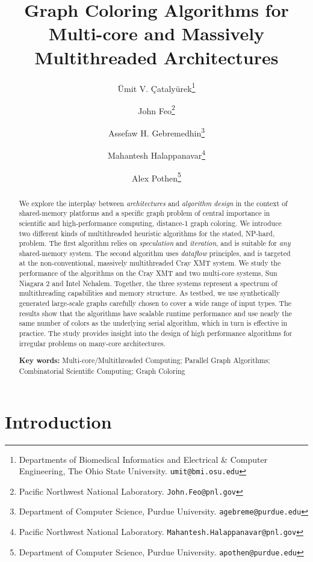 \documentclass{article}
\begin{document}
\title{Graph Coloring Algorithms for Multi-core and Massively Multithreaded Architectures}

\author{
\"Umit V. \c{C}ataly\"urek\footnote{Departments of Biomedical Informatics and Electrical \&
  Computer Engineering, The Ohio State University. {\tt umit@bmi.osu.edu}}
\and 
John Feo\footnote{Pacific Northwest National Laboratory. {\tt John.Feo@pnl.gov}}
\and 
Assefaw H. Gebremedhin\footnote{Department of Computer Science, Purdue University. {\tt agebreme@purdue.edu}}
\and 
Mahantesh Halappanavar\footnote{Pacific Northwest National Laboratory. {\tt Mahantesh.Halappanavar@pnl.gov}}
\and 
Alex Pothen\footnote{Department of Computer Science, Purdue University. {\tt apothen@purdue.edu}}
}

\maketitle

\begin{abstract}
We explore the interplay between {\em architectures} and {\em algorithm design}
in the context of shared-memory platforms and a specific graph problem of
central importance in scientific and high-performance computing,
distance-1 graph coloring.
We introduce two different kinds of  multithreaded heuristic algorithms
for the stated, NP-hard, problem.
The first algorithm relies on {\em speculation} and {\em iteration}, 
and is suitable for {\em any} shared-memory system.
The second algorithm uses {\em dataflow} principles, and is targeted at
the non-conventional, massively multithreaded Cray XMT system.  
We study the performance of the algorithms on the Cray XMT and
two multi-core systems, Sun Niagara 2 and Intel Nehalem.
Together, the three systems represent a spectrum of multithreading capabilities
and memory structure. 
As testbed, we use synthetically generated large-scale graphs carefully 
chosen to cover a wide range of input types.
The results show that the algorithms have scalable runtime performance
and use nearly the same number of colors as the underlying 
serial algorithm, which in turn is effective in practice.
The study provides insight into the design of high performance algorithms
for irregular problems on many-core architectures.

{\bf Key words:}
{\small Multi-core/Multithreaded Computing;
Parallel Graph Algorithms;
Combinatorial Scientific Computing; 
Graph Coloring}
\end{abstract}

\section{Introduction}
\label{sec:intro}
\end{document}
